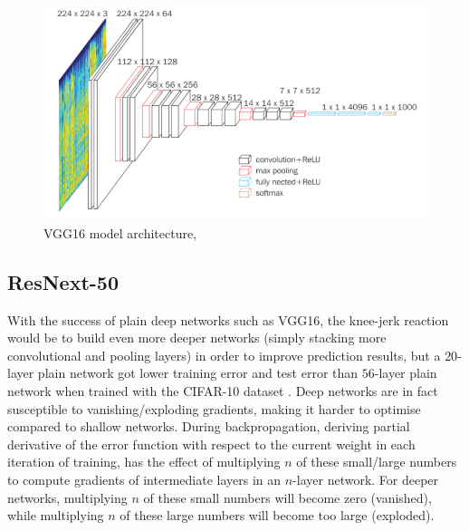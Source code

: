 \documentclass[12pt]{report}
\numberwithin{equation}{section}
\begin{document}
\begin{figure}[H]
\centering
\includegraphics[scale=0.8]{png/vgg16.png}
\caption[VGG16 model architecture]{VGG16 model architecture, }	
\label{fig:vgg16_arch}
\end{figure} 



\subsection{ResNext-50}
With the success of plain deep networks such as VGG16, the knee-jerk reaction would be to build even more deeper networks (simply stacking more convolutional and pooling layers) in order to improve prediction results, but a $20$-layer plain network got lower training error and test error than $56$-layer plain network when trained with the CIFAR-10 dataset {\cite{He2015DeepRL}}. Deep networks are in fact susceptible to vanishing/exploding gradients, making it harder to optimise compared to shallow networks. During backpropagation, deriving partial derivative of the error function with respect to the current weight in each iteration of training, has the effect of multiplying $n$ of these small/large numbers to compute gradients of intermediate layers in an $n$-layer network. For deeper networks, multiplying $n$ of these small numbers will become zero (vanished), while multiplying $n$ of these large numbers will become too large (exploded).
\end{document}
